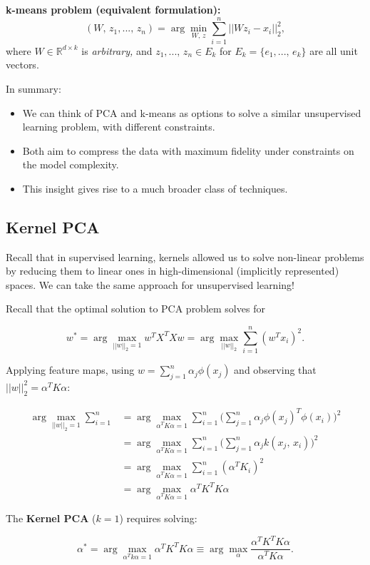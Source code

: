 \documentclass[a4paper]{extarticle}
\begin{document}
\textbf{k-means problem (equivalent formulation):}
\[
    (W, \, z_1,..., \, z_n) = \arg \min_{W, \, z} \sum_{i = 1}^n ||Wz_i - x_i||_2^2,
\]
where $W \in \mathbb{R}^{d \times k}$ is \textit{arbitrary,} and $z_1,..., \, z_n \in E_k$ for $E_k = \{e_1,..., \, e_k\}$ are all unit vectors.

In summary:
\begin{itemize}
    \item We can think of PCA and k-means as options to solve a similar unsupervised learning problem, with different constraints.
    \item Both aim to compress the data with maximum fidelity under constraints on the model complexity.
    \item This insight gives rise to a much broader class of techniques.
\end{itemize}

\subsection{Kernel PCA}

Recall that in supervised learning, kernels allowed us to solve non-linear problems by reducing them to linear ones in high-dimensional (implicitly represented) spaces. We can take the same approach for unsupervised learning!

Recall that the optimal solution to PCA problem solves for

\[
    w^* = \arg \max_{||w||_2 = 1} w^TX^TXw = \arg \max_{||w||_2} \sum_{i = 1}^n (w^Tx_i)^2.
\]

Applying feature maps, using $w = \sum_{j = 1}^n \alpha_j \phi(x_j)$ and observing that $||w||_2^2 = \alpha^TK\alpha$:

\begin{align*}
    \arg \max_{||w||_2 = 1} \sum_{i = 1}^n &= \arg \max_{\alpha^TK\alpha = 1} \sum_{i = 1}^n \Big(\sum_{j = 1}^n \alpha_j \phi(x_j)^T \phi(x_i) \Big)^2\\
    &= \arg \max_{\alpha^TK\alpha = 1} \sum_{i = 1}^n \Big(\sum_{j = 1}^n \alpha_j k(x_j, \, x_i) \Big)^2 \\
    &= \arg \max_{\alpha^TK\alpha = 1} \sum_{i = 1}^n (\alpha^TK_i)^2\\
    &= \arg \max_{\alpha^TK\alpha = 1} \alpha^TK^TK \alpha
\end{align*}

The \textbf{Kernel PCA} ($k = 1$) requires solving:

\[
    \alpha^* = \arg \max_{\alpha^Tk\alpha = 1} \alpha^TK^TK\alpha \equiv \arg \max_{\alpha} \frac{\alpha^TK^TK\alpha}{\alpha^TK\alpha}.
\]
\end{document}
